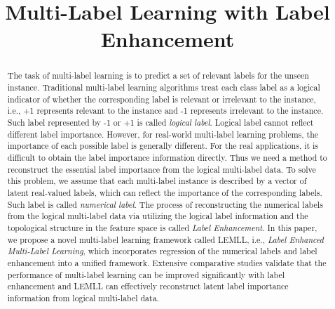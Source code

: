 \documentclass[conference]{IEEEtran}
\begin{document}
\title{Multi-Label Learning with Label Enhancement}

\author{


}

\maketitle

\begin{abstract}
The task of multi-label learning is to predict a set of relevant labels for the unseen instance. Traditional multi-label learning algorithms treat each class label as a logical indicator of whether the corresponding label is relevant or irrelevant to the instance, i.e., +1 represents relevant to the instance and -1 represents irrelevant to the instance. Such label represented by -1 or +1 is called \emph{logical label}. Logical label cannot reflect different label importance. However, for real-world multi-label learning problems, the importance of each possible label is generally different. For the real applications, it is difficult to obtain the label importance information directly. Thus we need a method to reconstruct the essential label importance from the logical multi-label data. To solve this problem, we assume that each multi-label instance is described by a vector of latent real-valued labels, which can reflect the importance of the corresponding labels. Such label is called \emph{numerical label}. The process of reconstructing the numerical labels from the logical multi-label data via utilizing the logical label information and the topological structure in the feature space is called \emph{Label Enhancement}. In this paper, we propose a novel multi-label learning framework called LEMLL, i.e., \emph{Label Enhanced Multi-Label Learning}, which incorporates regression of the numerical labels and label enhancement into a unified framework. Extensive comparative studies validate that the performance of multi-label learning can be improved significantly with label enhancement and LEMLL can effectively reconstruct latent label importance information from logical multi-label data.
\end{abstract}
\end{document}
